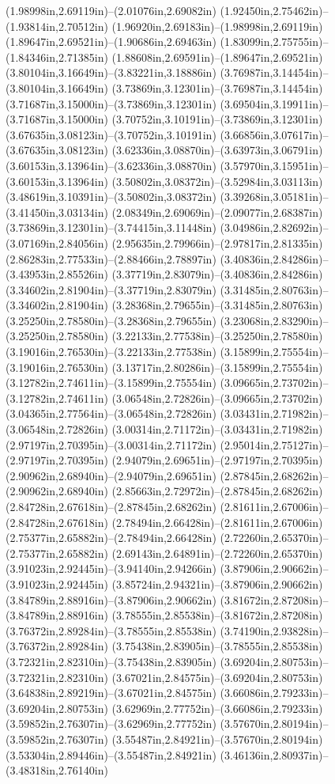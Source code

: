 (1.98998in,2.69119in)--(2.01076in,2.69082in) (1.92450in,2.75462in)--(1.93814in,2.70512in) (1.96920in,2.69183in)--(1.98998in,2.69119in) (1.89647in,2.69521in)--(1.90686in,2.69463in) (1.83099in,2.75755in)--(1.84346in,2.71385in) (1.88608in,2.69591in)--(1.89647in,2.69521in) (3.80104in,3.16649in)--(3.83221in,3.18886in) (3.76987in,3.14454in)--(3.80104in,3.16649in) (3.73869in,3.12301in)--(3.76987in,3.14454in) (3.71687in,3.15000in)--(3.73869in,3.12301in) (3.69504in,3.19911in)--(3.71687in,3.15000in) (3.70752in,3.10191in)--(3.73869in,3.12301in) (3.67635in,3.08123in)--(3.70752in,3.10191in) (3.66856in,3.07617in)--(3.67635in,3.08123in) (3.62336in,3.08870in)--(3.63973in,3.06791in) (3.60153in,3.13964in)--(3.62336in,3.08870in) (3.57970in,3.15951in)--(3.60153in,3.13964in) (3.50802in,3.08372in)--(3.52984in,3.03113in) (3.48619in,3.10391in)--(3.50802in,3.08372in) (3.39268in,3.05181in)--(3.41450in,3.03134in) (2.08349in,2.69069in)--(2.09077in,2.68387in) (3.73869in,3.12301in)--(3.74415in,3.11448in) (3.04986in,2.82692in)--(3.07169in,2.84056in) (2.95635in,2.79966in)--(2.97817in,2.81335in) (2.86283in,2.77533in)--(2.88466in,2.78897in) (3.40836in,2.84286in)--(3.43953in,2.85526in) (3.37719in,2.83079in)--(3.40836in,2.84286in) (3.34602in,2.81904in)--(3.37719in,2.83079in) (3.31485in,2.80763in)--(3.34602in,2.81904in) (3.28368in,2.79655in)--(3.31485in,2.80763in) (3.25250in,2.78580in)--(3.28368in,2.79655in) (3.23068in,2.83290in)--(3.25250in,2.78580in) (3.22133in,2.77538in)--(3.25250in,2.78580in) (3.19016in,2.76530in)--(3.22133in,2.77538in) (3.15899in,2.75554in)--(3.19016in,2.76530in) (3.13717in,2.80286in)--(3.15899in,2.75554in) (3.12782in,2.74611in)--(3.15899in,2.75554in) (3.09665in,2.73702in)--(3.12782in,2.74611in) (3.06548in,2.72826in)--(3.09665in,2.73702in) (3.04365in,2.77564in)--(3.06548in,2.72826in) (3.03431in,2.71982in)--(3.06548in,2.72826in) (3.00314in,2.71172in)--(3.03431in,2.71982in) (2.97197in,2.70395in)--(3.00314in,2.71172in) (2.95014in,2.75127in)--(2.97197in,2.70395in) (2.94079in,2.69651in)--(2.97197in,2.70395in) (2.90962in,2.68940in)--(2.94079in,2.69651in) (2.87845in,2.68262in)--(2.90962in,2.68940in) (2.85663in,2.72972in)--(2.87845in,2.68262in) (2.84728in,2.67618in)--(2.87845in,2.68262in) (2.81611in,2.67006in)--(2.84728in,2.67618in) (2.78494in,2.66428in)--(2.81611in,2.67006in) (2.75377in,2.65882in)--(2.78494in,2.66428in) (2.72260in,2.65370in)--(2.75377in,2.65882in) (2.69143in,2.64891in)--(2.72260in,2.65370in) (3.91023in,2.92445in)--(3.94140in,2.94266in) (3.87906in,2.90662in)--(3.91023in,2.92445in) (3.85724in,2.94321in)--(3.87906in,2.90662in) (3.84789in,2.88916in)--(3.87906in,2.90662in) (3.81672in,2.87208in)--(3.84789in,2.88916in) (3.78555in,2.85538in)--(3.81672in,2.87208in) (3.76372in,2.89284in)--(3.78555in,2.85538in) (3.74190in,2.93828in)--(3.76372in,2.89284in) (3.75438in,2.83905in)--(3.78555in,2.85538in) (3.72321in,2.82310in)--(3.75438in,2.83905in) (3.69204in,2.80753in)--(3.72321in,2.82310in) (3.67021in,2.84575in)--(3.69204in,2.80753in) (3.64838in,2.89219in)--(3.67021in,2.84575in) (3.66086in,2.79233in)--(3.69204in,2.80753in) (3.62969in,2.77752in)--(3.66086in,2.79233in) (3.59852in,2.76307in)--(3.62969in,2.77752in) (3.57670in,2.80194in)--(3.59852in,2.76307in) (3.55487in,2.84921in)--(3.57670in,2.80194in) (3.53304in,2.89446in)--(3.55487in,2.84921in) (3.46136in,2.80937in)--(3.48318in,2.76140in) 